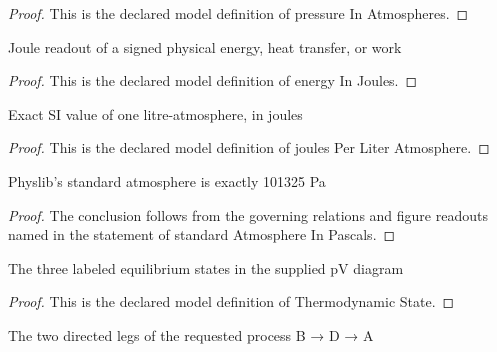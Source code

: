 \begin{proof}
  This is the declared model definition of pressure In Atmospheres.
\end{proof}
\begin{definition}
  \label{def:physics:phyx-mini-0491:phyxminiproblems-problemphyxmini0491-energyinjoules}
  Joule readout of a signed physical energy, heat transfer, or work
\end{definition}
\begin{proof}
  This is the declared model definition of energy In Joules.
\end{proof}
\begin{definition}
  \label{def:physics:phyx-mini-0491:phyxminiproblems-problemphyxmini0491-joulesperliteratmosphere}
  Exact SI value of one litre-atmosphere, in joules
\end{definition}
\begin{proof}
  This is the declared model definition of joules Per Liter Atmosphere.
\end{proof}
\begin{lemma}
  \label{lem:physics:phyx-mini-0491:phyxminiproblems-problemphyxmini0491-standardatmosphereinpascals}
  Physlib's standard atmosphere is exactly 101325 Pa
\end{lemma}
\begin{proof}
  The conclusion follows from the governing relations and figure readouts named in the statement of standard Atmosphere In Pascals.
\end{proof}
\begin{definition}
  \label{def:physics:phyx-mini-0491:phyxminiproblems-problemphyxmini0491-thermodynamicstate}
  The three labeled equilibrium states in the supplied pV diagram
\end{definition}
\begin{proof}
  This is the declared model definition of Thermodynamic State.
\end{proof}
\begin{definition}
  \label{def:physics:phyx-mini-0491:phyxminiproblems-problemphyxmini0491-processleg}
  The two directed legs of the requested process B → D → A
\end{definition}
